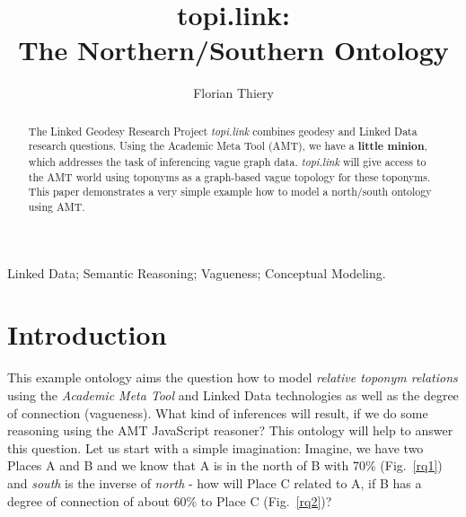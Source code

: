 \documentclass[twocolumn]{autart}
\begin{document}
\begin{frontmatter}

\title{topi.link: \protect\\ The Northern/Southern Ontology}
                                               

\author[FT]{Florian Thiery}

\address[FT]{rse@fthiery.de - ORCID: 0000-0002-3246-3531 \protect\\ Research Software Engineer, Mainz, Germany}                                                               

          
\begin{keyword}                             
Linked Data; Semantic Reasoning; Vagueness; Conceptual Modeling. 
\end{keyword}

\begin{abstract}                         

The Linked Geodesy Research Project \textit{topi.link} combines geodesy and Linked Data research questions. Using the Academic Meta Tool (AMT), we have a \textbf{little minion}, which addresses the task of inferencing vague graph data. \textit{topi.link} will give access to the AMT world using toponyms as a graph-based vague topology for these toponyms. This paper demonstrates a very simple example how to model a north/south ontology using AMT.

\end{abstract}

\end{frontmatter}

\section{Introduction}

This example ontology aims the question how to model \textit{relative toponym relations} using the \emph{Academic Meta Tool}\cite{unold_academic_2019} and Linked Data technologies as well as the degree of connection (vagueness). What kind of inferences will result, if we do some reasoning using the AMT JavaScript\cite{thiery_zenodo_3} reasoner? This ontology will help to answer this question. Let us start with a simple imagination: Imagine, we have two Places A and B and we know that A is in the north of B with 70\% (Fig.~\ref{rq1}) and \textit{south} is the inverse of \textit{north} - how will Place C related to A, if B has a degree of connection of about 60\% to Place C (Fig.~\ref{rq2})? 
\end{document}
